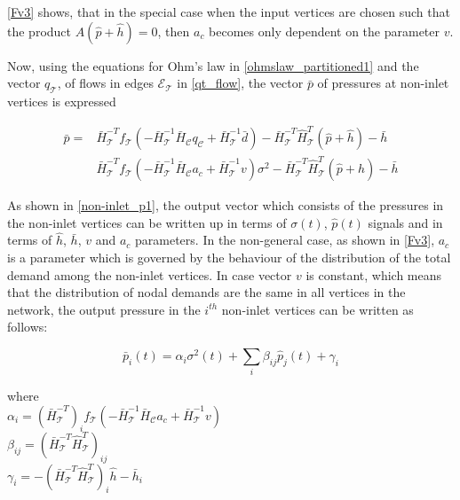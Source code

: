\eqref{Fv3} shows, that in the special case when the input vertices are chosen such that the product $A(\hat{p} + \hat{h}) = 0$, then $a_c$ becomes only dependent on the parameter $v$. 

Now, using the equations for Ohm's law in \eqref{ohmslaw_partitioned1} and the vector $q_{\mathcal{T}}$, of flows in edges $\mathcal{E}_{\mathcal{T}}$ in \eqref{qt_flow}, the vector $\bar{p}$ of pressures at non-inlet vertices is expressed

\begin{equation}
\begin{split}
  \label{non-inlet_p1}
  \bar{p} = & \bar{H}^{-T}_{\mathcal{T}}f_{\mathcal{T}}(-\bar{H}^{-1}_{\mathcal{T}} \bar{H}_{\mathcal{C}} q_\mathcal{C} + \bar{H}^{-1}_{\mathcal{T}} \bar{d}) - \bar{H}^{-T}_{\mathcal{T}}\hat{H}^{T}_{\mathcal{T}} (\hat{p} + \hat{h}) - \bar{h} \\
  & \bar{H}^{-T}_{\mathcal{T}}f_{\mathcal{T}}(-\bar{H}^{-1}_{\mathcal{T}} \bar{H}_{\mathcal{C}} a_c + \bar{H}^{-1}_{\mathcal{T}} v)\sigma^2 - \bar{H}^{-T}_{\mathcal{T}}\hat{H}^{T}_{\mathcal{T}} (\hat{p} + \hat{h}) - \bar{h}
\end{split}
\end{equation}

As shown in \eqref{non-inlet_p1}, the output vector which consists of the pressures in the non-inlet vertices can be written up in terms of $\sigma(t)$, $\hat{p}(t)$ signals and in terms of $\hat{h}$, $\bar{h}$, $v$ and $a_c$ parameters. In the non-general case, as shown in \eqref{Fv3}, $a_c$ is a parameter which is governed by the behaviour of the distribution of the total demand among the non-inlet vertices. In case vector $v$ is constant, which means that the distribution of nodal demands are the same in all vertices in the network, the output pressure in the $i^{th}$ non-inlet vertices can be written as follows: 

\begin{equation}
\label{model_multiinlet1}
\bar{p}_i(t) = \alpha_i \sigma^2(t) + \sum_i \beta_{ij} \hat{p}_j(t) + \gamma_i
\end{equation}

  \begin{minipage}[t]{0.50\textwidth}
where\\
\hspace*{8mm} $ \alpha_i = (\bar{H}^{-T}_{\mathcal{T}})_i f_{\mathcal{T}}(-\bar{H}^{-1}_{\mathcal{T}} \bar{H}_{\mathcal{C}} a_c + \bar{H}^{-1}_{\mathcal{T}} v)$ \\
\vspace*{7pt}
\hspace*{8mm} $ \beta_{ij} = (\bar{H}^{-T}_{\mathcal{T}}\hat{H}^{T}_{\mathcal{T}})_{ij} $ \\
\vspace*{7pt}
\hspace*{8mm} $ \gamma_{i} = -(\bar{H}^{-T}_{\mathcal{T}}\hat{H}^{T}_{\mathcal{T}})_{i}\hat{h} - \bar{h}_i $ 

\end{minipage}

